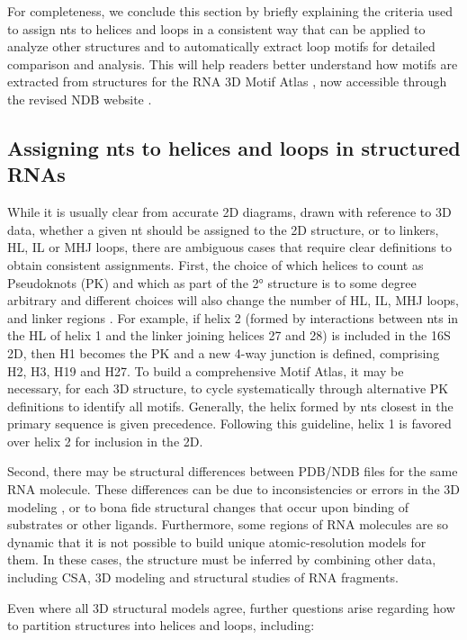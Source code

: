 For completeness, we conclude this section by briefly explaining the criteria
used to assign nts to helices and loops in a consistent way that can be applied
to analyze other structures and to automatically extract loop motifs for
detailed comparison and analysis.  This will help readers better understand how
motifs are extracted from structures for the RNA 3D Motif Atlas \cite{Petrov2013}, now
accessible through the revised NDB website \cite{CoimbatoreNarayanan2014}. 

\subsection{Assigning nts to helices and loops in structured RNAs}

While it is usually clear from accurate 2D diagrams, drawn with reference to 3D
data, whether a given nt should be assigned to the 2D structure, or to linkers,
HL, IL or MHJ loops, there are ambiguous cases that require clear definitions to
obtain consistent assignments. First, the choice of which helices to count as
Pseudoknots (PK) and which as part of the 2° structure is to some degree
arbitrary and different choices will also change the number of HL, IL, MHJ
loops, and linker regions \cite{Smit2008}. For example, if helix 2 (formed by
interactions between nts in the HL of helix 1 and the linker joining helices 27
and 28) is included in the 16S 2D, then H1 becomes the PK and a new 4-way
junction is defined, comprising H2, H3, H19 and H27. To build a comprehensive
Motif Atlas, it may be necessary, for each 3D structure, to cycle systematically
through alternative PK definitions to identify all motifs. Generally, the helix
formed by nts closest in the primary sequence is given precedence. Following
this guideline, helix 1 is favored over helix 2 for inclusion in the 2D. 

Second, there may be structural differences between PDB/NDB files for the same
RNA molecule. These differences can be due to inconsistencies or errors in the
3D modeling \cite{Stombaugh2009}, or to bona fide structural changes that occur
upon binding of substrates or other ligands. Furthermore, some regions of RNA
molecules are so dynamic that it is not possible to build unique
atomic-resolution models for them. In these cases, the structure must be
inferred by combining other data, including CSA, 3D modeling and structural
studies of RNA fragments. 

Even where all 3D structural models agree, further questions arise regarding how
to partition structures into helices and loops, including:

